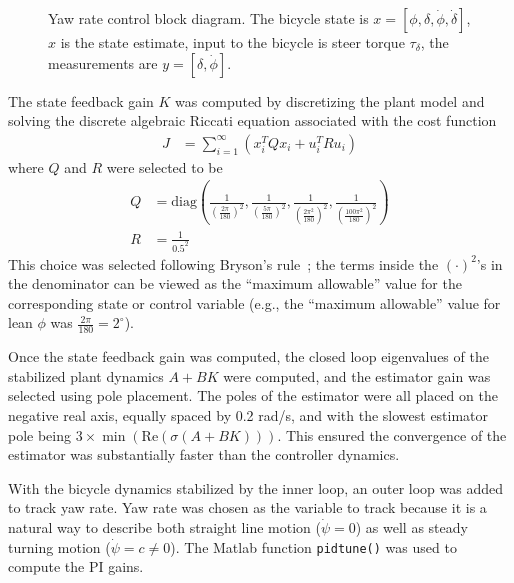 \begin{figure}[htbp]
  \caption[Yaw rate control block diagram.]{Yaw rate control block diagram. The
    bicycle state is $x=[\phi, \delta, \dot{\phi}, \dot{\delta}]$, $\hat{x}$ is
    the state estimate, input to the bicycle is steer torque $\tau_\delta$, the
    measurements are $y = [\delta, \dot{\phi}]$.}
  \label{rb:fig:yr_block_diagram}
\end{figure}
The state feedback gain $K$ was computed by discretizing the plant model and
solving the discrete algebraic Riccati equation associated with the cost
function
\begin{align}
  J &= \sum_{i=1}^{\infty} (x_i^T Q x_i + u_i^T R u_i)
\end{align}
where $Q$ and $R$ were selected to be
\begin{align}
  Q &= \text{diag}(\frac{1}{(\frac{2\pi}{180})^{2}},
                   \frac{1}{(\frac{5\pi}{180})^{2}},
                   \frac{1}{(\frac{2\pi^2}{180})^{2}},
                   \frac{1}{(\frac{100\pi^2}{180})^{2}}) \\
  R &= \frac{1}{0.5^2}
\end{align}
This choice was selected following Bryson's rule~\cite{Bryson1975}; the terms
inside the $(\cdot)^2$'s in the denominator can be viewed as the ``maximum
allowable'' value for the corresponding state or control variable (e.g., the
``maximum allowable'' value for lean $\phi$ was $\frac{2\pi}{180}=2^{\circ}$).

Once the state feedback gain was computed, the closed loop eigenvalues of the
stabilized plant dynamics $A+BK$ were computed, and the estimator gain was
selected using pole placement. The poles of the estimator were all placed on
the negative real axis, equally spaced by 0.2 rad/s, and with the slowest estimator
pole being $3 \times \min(\text{Re}(\sigma(A+BK)))$. This ensured the convergence of
the estimator was substantially faster than the controller dynamics.

With the bicycle dynamics stabilized by the inner loop, an outer loop was added
to track yaw rate. Yaw rate was chosen as the variable to track because it is a
natural way to describe both straight line motion ($\dot{\psi}=0$) as well as
steady turning motion ($\dot{\psi}=c\ne0$). The Matlab function
\verb|pidtune()| was used to compute the PI gains.

